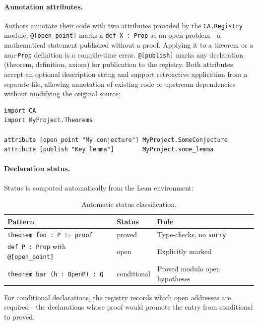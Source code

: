\paragraph{Annotation attributes.}
Authors annotate their code with two attributes provided by the
\texttt{CA.Registry} module.
\texttt{@[open\_point]} marks a \texttt{def X : Prop} as an open
problem---a mathematical statement published without a proof.
Applying it to a theorem or a non-\texttt{Prop} definition is a
compile-time error.
\texttt{@[publish]} marks any declaration (theorem, definition, axiom)
for publication to the registry.
Both attributes accept an optional description string and support
retroactive application from a separate file, allowing annotation of
existing code or upstream dependencies without modifying the original
source:

\begin{lstlisting}[caption={Retroactive annotation of existing declarations}]
import CA
import MyProject.Theorems

attribute [open_point "My conjecture"] MyProject.SomeConjecture
attribute [publish "Key lemma"]        MyProject.some_lemma
\end{lstlisting}

\paragraph{Declaration status.}
Status is computed automatically from the Lean environment:

\begin{table}[h]
\centering
\begin{tabular}{@{}lll@{}}
  \toprule
  \textbf{Pattern} & \textbf{Status} & \textbf{Rule} \\
  \midrule
  \texttt{theorem foo : P := proof} & proved & Type-checks, no \texttt{sorry} \\
  \texttt{def P : Prop} with \texttt{@[open\_point]} & open & Explicitly marked \\
  \texttt{theorem bar (h : OpenP) : Q} & conditional & Proved modulo open hypotheses \\
  \bottomrule
\end{tabular}
\caption{Automatic status classification.}
\label{tab:status}
\end{table}

For conditional declarations, the registry records which open addresses
are required---the declarations whose proof would promote the entry
from conditional to proved.

